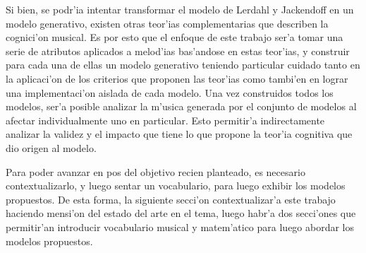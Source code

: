 Si bien, se podr'ia intentar transformar el modelo de Lerdahl y Jackendoff en un modelo generativo, existen otras teor'ias complementarias que describen
la cognici'on musical. Es por esto que el enfoque de este trabajo ser'a tomar una serie de atributos aplicados a melod'ias bas'andose en estas teor'ias, 
y construir para cada una de ellas un modelo generativo teniendo particular cuidado
tanto en la aplicaci'on de los criterios que proponen las teor'ias como tambi'en en lograr una implementaci'on aislada de cada modelo. 
Una vez construidos todos los modelos, ser'a posible analizar la m'usica generada por el conjunto de modelos al afectar individualmente uno en particular. Esto
permitir'a indirectamente analizar la validez y el impacto que tiene lo que propone la teor'ia cognitiva que dio origen al modelo.

Para poder avanzar en pos del objetivo recien planteado, es necesario contextualizarlo, y luego sentar un vocabulario, para luego exhibir los
modelos propuestos. De esta forma, la siguiente secci'on contextualizar'a este trabajo haciendo mensi'on del estado del arte en el tema, luego
habr'a dos secci'ones que permitir'an introducir vocabulario musical y matem'atico para luego abordar los modelos propuestos.

